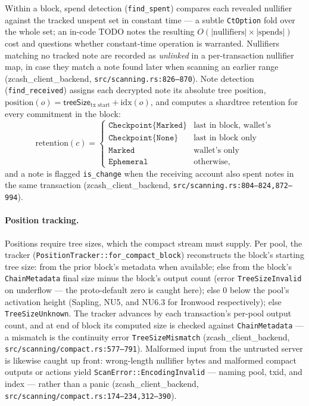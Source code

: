 \documentclass[11pt,a4paper]{article}
\theoremstyle{definition}
\begin{document}
Within a block, spend detection (\texttt{find\_spent}) compares each
revealed nullifier against the tracked unspent set in constant time --- a
\textsf{subtle} \texttt{CtOption} fold over the whole set; an in-code TODO
notes the resulting
$O(|\text{nullifiers}| \times |\text{spends}|)$ cost and questions whether
constant-time operation is warranted. Nullifiers matching no tracked note
are recorded as \emph{unlinked} in a per-transaction nullifier map, in case
they match a note found later when scanning an earlier range
(\textsf{zcash\_client\_backend}, \texttt{src/scanning.rs:826--870}).
Note detection (\texttt{find\_received}) assigns each decrypted note its
absolute tree position,
$\mathrm{position}(o) = \mathsf{treeSize}_{\text{tx start}} +
\mathrm{idx}(o)$, and computes a \textsf{shardtree} retention for every
commitment in the block:
\[
\mathrm{retention}(c) =
\begin{cases}
\texttt{Checkpoint\{Marked\}} & \text{last in block, wallet's} \\
\texttt{Checkpoint\{None\}}   & \text{last in block only} \\
\texttt{Marked}               & \text{wallet's only} \\
\texttt{Ephemeral}            & \text{otherwise,}
\end{cases}
\]
and a note is flagged \texttt{is\_change} when the receiving account also
spent notes in the same transaction
(\textsf{zcash\_client\_backend}, \texttt{src/scanning.rs:804--824,872--994}).

\paragraph{Position tracking.} Positions require tree sizes, which the
compact stream must supply. Per pool, the tracker
(\texttt{PositionTracker::for\_compact\_block}) reconstructs the block's
starting tree size: from the prior block's metadata when available; else
from the block's \texttt{ChainMetadata} final size minus the block's output
count (error \texttt{TreeSizeInvalid} on underflow --- the proto-default
zero is caught here); else $0$ below the pool's activation height (Sapling,
NU5, and NU6.3 for Ironwood respectively); else \texttt{TreeSizeUnknown}.
The tracker advances by each transaction's per-pool output count, and at
end of block its computed size is checked against \texttt{ChainMetadata}
--- a mismatch is the continuity error \texttt{TreeSizeMismatch}
(\textsf{zcash\_client\_backend}, \texttt{src/scanning/compact.rs:577--791}).
Malformed input from the untrusted server is likewise caught up front:
wrong-length nullifier bytes and malformed compact outputs or actions yield
\texttt{ScanError::EncodingInvalid} --- naming pool, txid, and index ---
rather than a panic
(\textsf{zcash\_client\_backend},
\texttt{src/scanning/compact.rs:174--234,312--390}).
\end{document}
